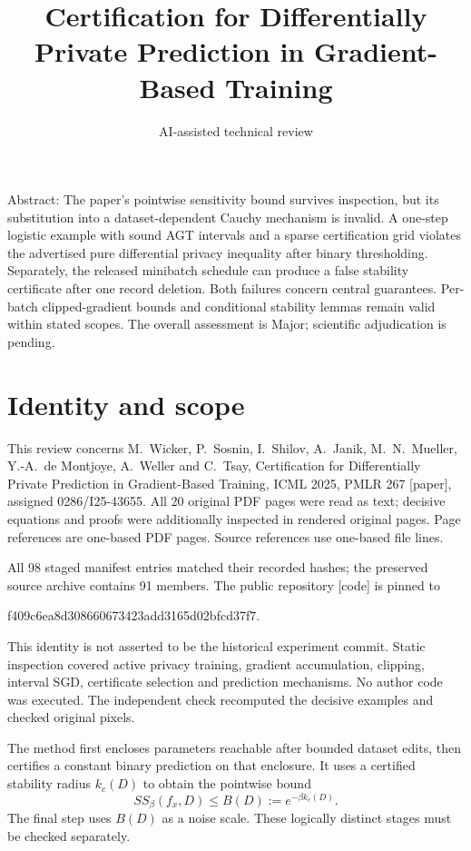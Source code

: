 \documentclass[10pt]{article}
\title{Certification for Differentially Private Prediction in Gradient-Based Training}
\author{AI-assisted technical review}
\date{}
\begin{document}
\maketitle
Abstract: The paper’s pointwise sensitivity bound survives inspection, but its substitution into a dataset-dependent Cauchy mechanism is invalid. A one-step logistic example with sound AGT intervals and a sparse certification grid violates the advertised pure differential privacy inequality after binary thresholding. Separately, the released minibatch schedule can produce a false stability certificate after one record deletion. Both failures concern central guarantees. Per-batch clipped-gradient bounds and conditional stability lemmas remain valid within stated scopes. The overall assessment is Major; scientific adjudication is pending.\par
\section*{Identity and scope}
This review concerns M. Wicker, P. Sosnin, I. Shilov, A. Janik, M. N. Mueller, Y.-A. de Montjoye, A. Weller and C. Tsay, Certification for Differentially Private Prediction in Gradient-Based Training, ICML 2025, PMLR 267 [paper], assigned 0286/I25-43655. All 20 original PDF pages were read as text; decisive equations and proofs were additionally inspected in rendered original pages. Page references are one-based PDF pages. Source references use one-based file lines.\par
All 98 staged manifest entries matched their recorded hashes; the preserved source archive contains 91 members. The public repository [code] is pinned to\par
f409c6ea8d308660673423add3165d02bfcd37f7.\par
This identity is not asserted to be the historical experiment commit. Static inspection covered active privacy training, gradient accumulation, clipping, interval SGD, certificate selection and prediction mechanisms. No author code was executed. The independent check recomputed the decisive examples and checked original pixels.\par
The method first encloses parameters reachable after bounded dataset edits, then certifies a constant binary prediction on that enclosure. It uses a certified stability radius \(k_c(D)\) to obtain the pointwise bound \[SS_\beta(f_x,D)\le B(D):=e^{-\beta k_c(D)}.\] The final step uses \(B(D)\) as a noise scale. These logically distinct stages must be checked separately.\par
\end{document}
